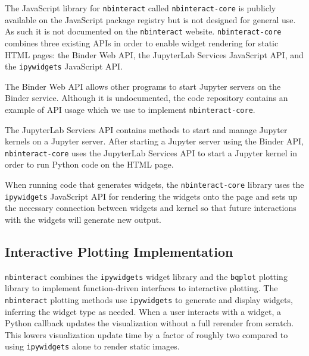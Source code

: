 \documentclass[nobib]{tufte-handout}
\newcommand{\code}[1]{\texttt{#1}}
\begin{document}
The JavaScript library for \code{nbinteract} called \code{nbinteract-core} is
publicly available on the JavaScript package
registry but is not designed for general
use. As such it is not documented on the \code{nbinteract} website.
\code{nbinteract-core} combines three existing APIs in order to enable widget
rendering for static HTML pages: the Binder Web API, the JupyterLab Services
JavaScript API, and the \code{ipywidgets} JavaScript API.

The Binder Web API allows other programs to start Jupyter servers on the Binder
service. Although it is undocumented, the code repository contains an example
of API usage which we use to
implement \code{nbinteract-core}.

The JupyterLab Services API contains methods to start and manage Jupyter
kernels on a Jupyter server. After
starting a Jupyter server using the Binder API, \code{nbinteract-core} uses the
JupyterLab Services API to start a Jupyter kernel in order to run Python code
on the HTML page.

When running code that generates widgets, the \code{nbinteract-core} library
uses the \code{ipywidgets} JavaScript API for rendering the widgets onto the
page and sets up
the necessary connection between widgets and kernel so that future interactions
with the widgets will generate new output.


\subsection{Interactive Plotting Implementation} %
\label{sub:interactive_plotting_implementation}

\code{nbinteract} combines the \code{ipywidgets} widget library and the
\code{bqplot} plotting
library to implement function-driven interfaces to interactive plotting. The
\code{nbinteract} plotting methods use \code{ipywidgets} to generate and
display widgets, inferring the widget type as needed. When a user interacts
with a widget, a Python callback updates the visualization without a
full rerender from scratch. This lowers visualization update time by a factor
of roughly two compared to using \code{ipywidgets} alone to render static
images.
\end{document}
